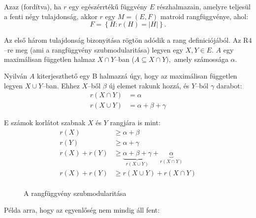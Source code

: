 Azaz (fordítva), ha $r$ egy egészérrtékű függvény $E$ részhalmazain, amelyre
teljesül a fenti négy tulajdonság, akkor $r$ egy $M=(E,F)$ matroid rangfüggvénye,
ahol:
\[F=\left\{ H : r(H)=|H| \right\}. \]

Az első három tulajdonság bizonyitása rögtön adódik a rang definiciójából. Az
R$4$--re meg (ami a rangfüggvény szubmodularitása) legyen egy $X,Y \in E$. $A$
egy maximálisan független halmaz $X \cap Y$--ban ($A \subseteq X \cap Y),$ amely
számossága $\alpha$. 

Nyilván $A$ kiterjeszthető egy B halmazzá úgy, hogy az maximálisan független
legyen $X \cup Y$--ban. Ehhez $X$--ből $\beta$ új elemet rakunk hozzá, és
$Y$--ból $\gamma$ darabot:
\begin{align*}
r(X \cap Y) &= \alpha \\
r(X \cup Y) &= \alpha + \beta + \gamma
\end{align*}

E számok korlátot szabnak $X$ és $Y$ rangjára is mint: 
\begin{align*}
r(X) &\geq \alpha + \beta \\ 
r(Y) &\geq \alpha + \gamma \\
r(X) + r(Y) &\geq \underbrace{\alpha + \beta + \gamma}_{r(X \cup Y)} + \underbrace{\alpha}_{r(X \cap Y)} \\
r(X) + r(Y) &\geq r(X \cup Y) + r(X \cap Y) \\
\end{align*}

\begin{figure}[htbp]
\centering
{}
\caption{A rangfüggvény szubmodularitása}\label{fig:RangSzub}
\end{figure}

Példa arra, hogy az egyenlőség nem mindig áll fent:
\vspace{0.4cm}

